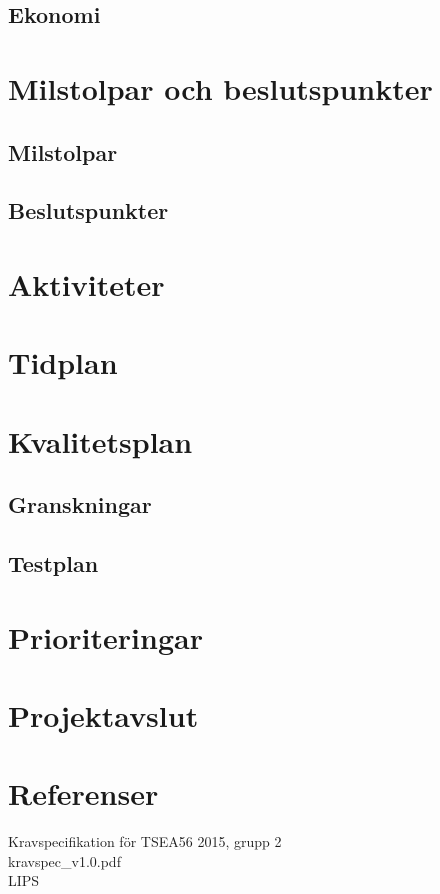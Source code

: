 \documentclass[11pt]{article}
\begin{document}
\begin{flushleft}
\subsection{Ekonomi}

\pagebreak

\section{Milstolpar och beslutspunkter}

\subsection{Milstolpar}

\subsection{Beslutspunkter}

\pagebreak

\section{Aktiviteter}

\pagebreak

\section{Tidplan}

\pagebreak

\section{Kvalitetsplan}

\subsection{Granskningar}

\subsection{Testplan}

\pagebreak

\section{Prioriteringar}

\pagebreak

\section{Projektavslut}

\setcounter{secnumdepth}{0}
\pagebreak
\section{Referenser}
Kravspecifikation för TSEA56 2015, grupp 2\\
kravspec\_v1.0.pdf \\[0.1in]

LIPS

\setcounter{secnumdepth}{2}


\end{flushleft}
\end{document}
